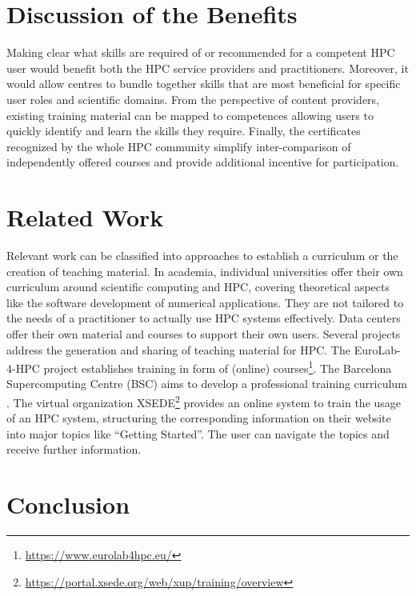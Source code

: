 \documentclass[jocse]{jocseart}
\newcommand{\jk}[1]{\todo[inline]{TODO: #1}}
\begin{document}
\section{Discussion of the Benefits}

Making clear what skills are required of or recommended for a competent HPC user would benefit both the HPC service providers and practitioners.
Moreover, it would allow centres to bundle together skills that are most beneficial for specific user roles and scientific domains.
From the perspective of content providers, existing training material can be mapped to competences allowing users to quickly identify and learn the skills they require.
Finally, the certificates recognized by the whole HPC community simplify inter-comparison of independently offered courses and provide additional incentive for participation.


\section{Related Work}
\jk{Please everyone!}

Relevant work can be classified into approaches to establish a curriculum or the creation of teaching material.
In academia, individual universities offer their own curriculum around scientific computing and HPC, covering theoretical aspects like the software development of numerical applications.
They are not tailored to the needs of a practitioner to actually use HPC systems effectively.
Data centers offer their own material and courses to support their own users.
Several projects address the generation and sharing of teaching material for HPC.
The EuroLab-4-HPC project establishes training in form of (online) courses\footnote{\url{https://www.eurolab4hpc.eu/}}.
The Barcelona Supercomputing Centre (BSC) aims to develop a professional training curriculum \cite{sancho2016bsc}.
The virtual organization XSEDE\footnote{\url{https://portal.xsede.org/web/xup/training/overview}} provides an online system to train the usage of an HPC system, structuring the corresponding information on their website into major topics like “Getting Started”.
The user can navigate the topics and receive further information.

\section{Conclusion}
\end{document}
